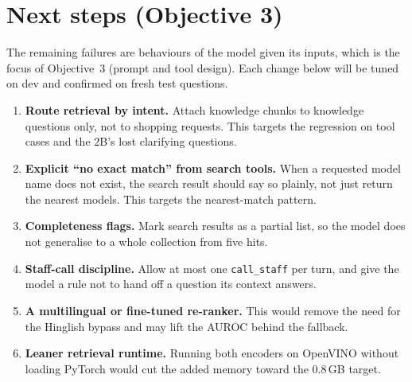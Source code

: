\documentclass[11pt,a4paper]{article}
\begin{document}
\section{Next steps (Objective 3)}\label{sec:next}
The remaining failures are behaviours of the model given its inputs, which is the focus of Objective~3 (prompt and
tool design). Each change below will be tuned on dev and confirmed on fresh test questions.
\begin{enumerate}
  \item \textbf{Route retrieval by intent.} Attach knowledge chunks to knowledge questions only, not to shopping
        requests. This targets the regression on tool cases and the 2B's lost clarifying questions.
  \item \textbf{Explicit ``no exact match'' from search tools.} When a requested model name does not exist, the search
        result should say so plainly, not just return the nearest models. This targets the nearest-match pattern.
  \item \textbf{Completeness flags.} Mark search results as a partial list, so the model does not generalise to a whole
        collection from five hits.
  \item \textbf{Staff-call discipline.} Allow at most one \texttt{call\_staff} per turn, and give the model a rule not to
        hand off a question its context answers.
  \item \textbf{A multilingual or fine-tuned re-ranker.} This would remove the need for the Hinglish bypass and may lift
        the AUROC behind the fallback.
  \item \textbf{Leaner retrieval runtime.} Running both encoders on OpenVINO without loading PyTorch would cut the added
        memory toward the 0.8\,GB target.
\end{enumerate}
\end{document}
